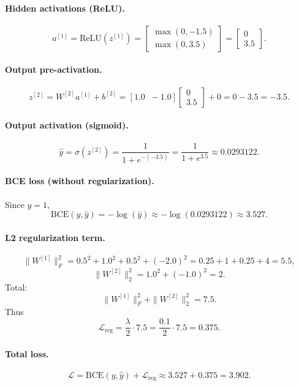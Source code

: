 \documentclass{article}
\begin{document}
\paragraph{Hidden activations (ReLU).}
\[
a^{[1]} = \mathrm{ReLU}(z^{[1]}) =
\begin{bmatrix}
\max(0,-1.5)\\
\max(0,3.5)
\end{bmatrix}
=
\begin{bmatrix}
0\\
3.5
\end{bmatrix}.
\]

\paragraph{Output pre-activation.}
\[
z^{[2]} = W^{[2]}a^{[1]} + b^{[2]}
= [1.0\;\;-1.0] \begin{bmatrix}0\\3.5\end{bmatrix} + 0
= 0 - 3.5 = -3.5.
\]

\paragraph{Output activation (sigmoid).}
\[
\hat y = \sigma(z^{[2]}) = \frac{1}{1+e^{-(-3.5)}}
= \frac{1}{1+e^{3.5}}
\approx 0.0293122.
\]

\paragraph{BCE loss (without regularization).}
Since $y=1$,
\[
\mathrm{BCE}(y,\hat y) = -\log(\hat y) \approx -\log(0.0293122) \approx 3.527.
\]

\paragraph{L2 regularization term.}
\[
\|W^{[1]}\|_F^2 =
0.5^2 + 1.0^2 + 0.5^2 + (-2.0)^2
= 0.25 + 1 + 0.25 + 4 = 5.5,
\]
\[
\|W^{[2]}\|_2^2 = 1.0^2 + (-1.0)^2 = 2.
\]
Total:
\[
\|W^{[1]}\|_F^2 + \|W^{[2]}\|_2^2 = 7.5.
\]
Thus
\[
\mathcal{L}_{\text{reg}}
= \frac{\lambda}{2}\cdot 7.5
= \frac{0.1}{2}\cdot 7.5 = 0.375.
\]

\paragraph{Total loss.}
\[
\mathcal{L} = \mathrm{BCE}(y,\hat y) + \mathcal{L}_{\text{reg}}
\approx 3.527 + 0.375 = 3.902.
\]
\end{document}
